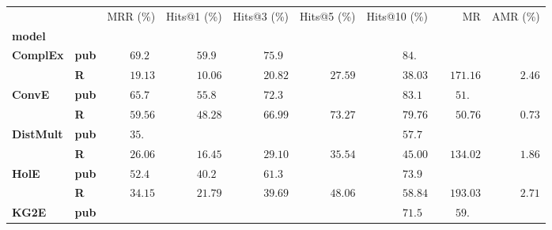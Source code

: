 \begin{tabular}{llrrrrrrr}
\toprule
       &   &           MRR (\%) &        Hits@1 (\%) &        Hits@3 (\%) &        Hits@5 (\%) &       Hits@10 (\%) &                              MR &            AMR (\%) \\
\textbf{model} & {} &                    &                    &                    &                    &                    &                                 &                     \\
\midrule
\textbf{ComplEx} & \textbf{pub} &  $69.2\phantom{0}$ &  $59.9\phantom{0}$ &  $75.9\phantom{0}$ &                    &  $84.\phantom{00}$ &                                 &                     \\
       & \textbf{R} &            $19.13$ &            $10.06$ &            $20.82$ &            $27.59$ &            $38.03$ &            $\phantom{00}171.16$ &  $\phantom{00}2.46$ \\\midrule
\textbf{ConvE} & \textbf{pub} &  $65.7\phantom{0}$ &  $55.8\phantom{0}$ &  $72.3\phantom{0}$ &                    &  $83.1\phantom{0}$ &  $\phantom{000}51.\phantom{00}$ &                     \\
       & \textbf{R} &            $59.56$ &            $48.28$ &            $66.99$ &            $73.27$ &            $79.76$ &            $\phantom{000}50.76$ &  $\phantom{00}0.73$ \\\midrule
\textbf{DistMult} & \textbf{pub} &  $35.\phantom{00}$ &                    &                    &                    &  $57.7\phantom{0}$ &                                 &                     \\
       & \textbf{R} &            $26.06$ &            $16.45$ &            $29.10$ &            $35.54$ &            $45.00$ &            $\phantom{00}134.02$ &  $\phantom{00}1.86$ \\\midrule
\textbf{HolE} & \textbf{pub} &  $52.4\phantom{0}$ &  $40.2\phantom{0}$ &  $61.3\phantom{0}$ &                    &  $73.9\phantom{0}$ &                                 &                     \\
       & \textbf{R} &            $34.15$ &            $21.79$ &            $39.69$ &            $48.06$ &            $58.84$ &            $\phantom{00}193.03$ &  $\phantom{00}2.71$ \\\midrule
\textbf{KG2E} & \textbf{pub} &                    &                    &                    &                    &  $71.5\phantom{0}$ &  $\phantom{000}59.\phantom{00}$ &                     \\

\end{tabular}
